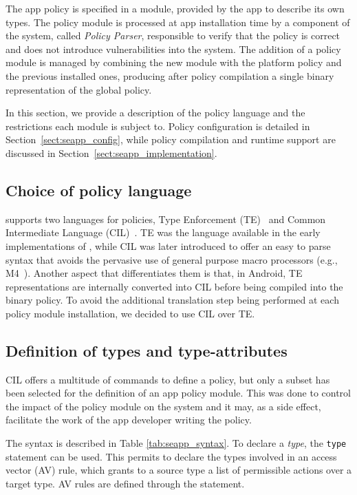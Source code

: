The app policy is specified in a module, provided by the app to
describe its own types.  The policy module is processed at app
installation time by a component of the system, called {\em \seapp
  Policy Parser}, responsible to verify that the policy is correct and
does not introduce vulnerabilities into the system.  The addition of a
policy module is managed by combining the new module with the platform
policy and the previous installed ones, producing after policy
compilation a single binary representation of the global policy.

In this section, we provide a description of the \seapp policy language
and the restrictions each module is subject to.  Policy configuration
is detailed in Section~\ref{sect:seapp_config}, while policy
compilation and runtime support are discussed in
Section~\ref{sect:seapp_implementation}.

\subsection{Choice of policy language}\label{seapp_lang}

\sea supports two languages for policies, Type Enforcement
(TE)~\cite{seapp_libte_rules} and Common Intermediate Language
(CIL)~\cite{seapp_cil}.  TE was the language available in the early
implementations of \sel, while CIL was later introduced to offer an
easy to parse syntax that avoids the pervasive use of general purpose
macro processors (e.g., M4~\cite{seapp_m4}).  Another aspect that
differentiates them is that, in Android, TE representations are
internally converted into CIL before being compiled into the \sel
binary policy.  To avoid the additional translation step being
performed at each policy module installation, we decided to use CIL
over TE.

\subsection{Definition of types and type-attributes}

CIL offers a multitude of commands to define a policy, but only a
subset has been selected for the definition of an app policy module.
This was done to control the impact of the policy module on the system
and it may, as a side effect, facilitate the work of the app developer
writing the policy.

The syntax is described in Table \ref{tab:seapp_syntax}.  To declare a
\emph{type}, the \texttt{type} statement can be used.  This permits to
declare the types involved in an access vector (AV) rule, which grants
to a source type a list of permissible actions over a target type.  AV
rules are defined through the \allow statement.

